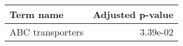 \begin{tabular}{lr}
\toprule
       Term name &  Adjusted p-value \\
\midrule
ABC transporters &          3.39e-02 \\
\bottomrule
\end{tabular}
